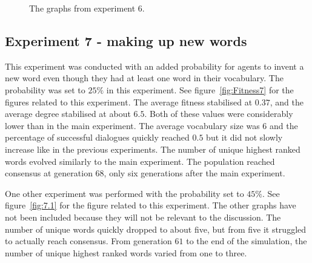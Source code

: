 \begin{figure}[htbp]
    \par \bigskip
    \caption{The graphs from experiment 6.}
    \label{fig:Fitness6}
\end{figure}


\subsection{Experiment 7 - making up new words}
This experiment was conducted with an added probability for agents to invent a new word even though they had at least one word in their vocabulary. The probability was set to $25\%$ in this experiment. See figure~\ref{fig:Fitness7} for the figures related to this experiment. The average fitness stabilised at $0.37$, and the average degree stabilised at about $6.5$. Both of these values were considerably lower than in the main experiment. The average vocabulary size was $6$ and the percentage of successful dialogues quickly reached $0.5$ but it did not slowly increase like in the previous experiments. The number of unique highest ranked words evolved similarly to the main experiment. The population reached consensus at generation $68$, only six generations after the main experiment. 

One other experiment was performed with the probability set to $45\%$. See figure~\ref{fig:7.1} for the figure related to this experiment. The other graphs have not been included because they will not be relevant to the discussion. The number of unique words quickly dropped to about five, but from five it struggled to actually reach consensus. From generation $61$ to the end of the simulation, the number of unique highest ranked words varied from one to three.  

